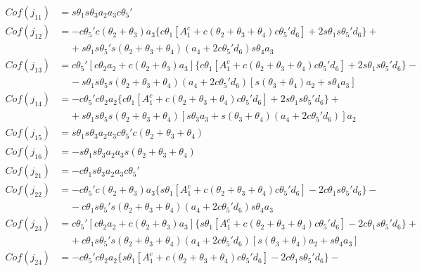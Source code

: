 \begin{align}
    \label{eq:jacobianainv-termos1} 
    Cof(j_{11}) &= s\theta_1s\theta_3a_2a_3c\theta_5' \nonumber \\    
    Cof(j_{12}) &= -c\theta_5'c(\theta_2+\theta_3)a_3\{c\theta_1[A_1^c+c(\theta_2+\theta_3+\theta_4)c\theta_5'd_6]+2s\theta_1s\theta_5'd_6\}+ \nonumber \\
                   & \;\;\;\; +\!s\theta_1s\theta_5's(\theta_2+\theta_3+\theta_4)(a_4+2c\theta_5'd_6)s\theta_4a_3 \nonumber \\
    Cof(j_{13}) &= c\theta_5'[c\theta_2a_2+c(\theta_2+\theta_3)a_3]\{c\theta_1[A_1^c+c(\theta_2+\theta_3+\theta_4)c\theta_5'd_6]+2s\theta_1s\theta_5'd_6\}- \nonumber \\
                   & \;\;\;\; -s\theta_1s\theta_5s(\theta_2+\theta_3+\theta_4)(a_4+2c\theta_5'd_6)[s(\theta_3+\theta_4)a_2+s\theta_4a_3] \nonumber \\
    Cof(j_{14}) &= -c\theta_5'c\theta_2a_2\{c\theta_1[A_1^c+c(\theta_2+\theta_3+\theta_4)c\theta_5'd_6]+2s\theta_1s\theta_5'd_6\}+ \nonumber \\
                   & \;\;\;\; +\!s\theta_1s\theta_5s(\theta_2+\theta_3+\theta_4)[s\theta_3a_3+s(\theta_3+\theta_4)(a_4+2c\theta_5'd_6)]a_2 \nonumber \\
    Cof(j_{15}) &= s\theta_1s\theta_3a_2a_3c\theta_5'c(\theta_2+\theta_3+\theta_4) \nonumber \\ 
    Cof(j_{16}) &= -s\theta_1s\theta_3a_2a_3s(\theta_2+\theta_3+\theta_4) \nonumber \\
    Cof(j_{21}) &= -c\theta_1s\theta_3a_2a_3c\theta_5' \nonumber \\    
    Cof(j_{22}) &= -c\theta_5'c(\theta_2+\theta_3)a_3\{s\theta_1[A_1^c+c(\theta_2+\theta_3+\theta_4)c\theta_5'd_6]-2c\theta_1s\theta_5'd_6\}- \nonumber \\
                   & \;\;\;\; -\!c\theta_1s\theta_5's(\theta_2+\theta_3+\theta_4)(a_4+2c\theta_5'd_6)s\theta_4a_3 \nonumber \\
    Cof(j_{23}) &= c\theta_5'[c\theta_2a_2+c(\theta_2+\theta_3)a_3]\{s\theta_1[A_1^c+c(\theta_2+\theta_3+\theta_4)c\theta_5'd_6]-2c\theta_1s\theta_5'd_6\}+ \nonumber \\
                   & \;\;\;\; +c\theta_1s\theta_5's(\theta_2+\theta_3+\theta_4)(a_4+2c\theta_5'd_6)[s(\theta_3+\theta_4)a_2+s\theta_4a_3] \nonumber \\
    Cof(j_{24}) &= -c\theta_5'c\theta_2a_2\{s\theta_1[A_1^c+c(\theta_2+\theta_3+\theta_4)c\theta_5'd_6]-2c\theta_1s\theta_5'd_6\}- \nonumber \\

\end{align}

